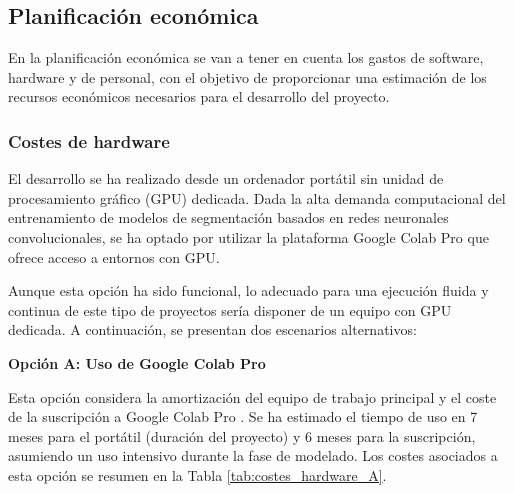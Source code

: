     
\subsection{Planificación económica}
En la planificación económica se van a tener en cuenta los gastos de software, hardware y de personal, con el objetivo de proporcionar una estimación de los recursos económicos necesarios para el desarrollo del proyecto.

\subsubsection{Costes de hardware}
El desarrollo se ha realizado desde un ordenador portátil sin unidad de procesamiento gráfico (GPU) dedicada. Dada la alta demanda computacional del entrenamiento de modelos de segmentación basados en redes neuronales convolucionales, se ha optado por utilizar la plataforma Google Colab Pro que ofrece acceso a entornos con GPU. 

Aunque esta opción ha sido funcional, lo adecuado para una ejecución fluida y continua de este tipo de proyectos sería disponer de un equipo con GPU dedicada. A continuación, se presentan dos escenarios alternativos:

\textbf{Opción A: Uso de Google Colab Pro}

Esta opción considera la amortización del equipo de trabajo principal y el coste de la suscripción a Google Colab Pro \cite{googlecolabpro_ref}. Se ha estimado el tiempo de uso en 7 meses para el portátil (duración del proyecto) y 6 meses para la suscripción, asumiendo un uso intensivo durante la fase de modelado. Los costes asociados a esta opción se resumen en la Tabla \ref{tab:costes_hardware_A}.

